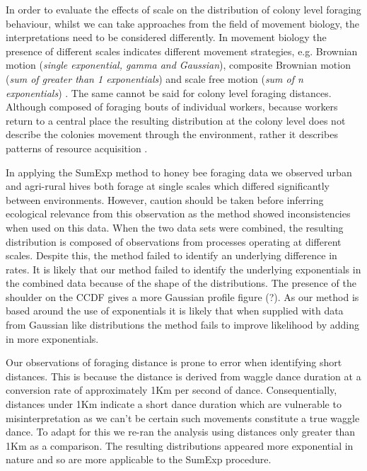 \documentclass[11pt,usenames,dvipsnames]{article}
\begin{document}
\begin{linenumbers}
\hspace{\parindent}
In order to evaluate the effects of scale on the distribution of colony level foraging behaviour, whilst we can take approaches from the field of movement biology, the interpretations need to be considered differently. In movement biology the presence of different scales indicates different movement strategies, e.g. Brownian motion (\textit{single exponential, gamma and Gaussian}), composite Brownian motion (\textit{sum of greater than 1 exponentials}) and scale free motion (\textit{sum of n exponentials}) \citep{Murphy2007, Petrovskii2011, Gautestad2012, Zhao2016, Sakamoto2017, Reynolds2018}. The same cannot be said for colony level foraging distances. Although composed of foraging bouts of individual workers, because workers return to a central place the resulting distribution at the colony level does not describe the colonies movement through the environment, rather it describes patterns of resource acquisition \citep{Visscher1982, Waddington1994, Couvillon2014, Couvillon2015}.

In applying the SumExp method to honey bee foraging data we observed urban and agri-rural hives both forage at single scales which differed significantly between environments. However, caution should be taken before inferring ecological relevance from this observation as the method showed inconsistencies when used on this data. When the two data sets were combined, the resulting distribution is composed of observations from processes operating at different scales. Despite this, the method failed to identify an underlying difference in rates. It is likely that our method failed to identify the underlying exponentials in the combined data because of the shape of the distributions. The presence of the shoulder on the CCDF gives a more Gaussian profile figure (?). As our method is based around the use of exponentials it is likely that when supplied with data from Gaussian like distributions the method fails to improve likelihood by adding in more exponentials.

Our observations of foraging distance is prone to error when identifying short distances. This is because the distance is derived from waggle dance duration at a conversion rate of approximately 1Km per second of dance. Consequentially, distances under 1Km indicate a short dance duration which are vulnerable to misinterpretation as we can't be certain such movements constitute a true waggle dance. To adapt for this we re-ran the analysis using distances only greater than 1Km as a comparison. The resulting distributions appeared more exponential in nature and so are more applicable to the SumExp procedure.


\end{linenumbers}
\end{document}
